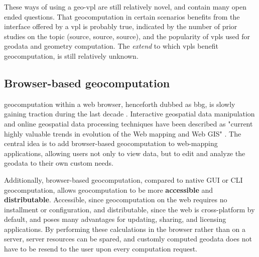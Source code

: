 These ways of using a \ac{geo-vpl} are still relatively novel, and contain many open ended questions. That geocomputation in certain scenarios benefits from the interface offered by a \ac{vpl} is probably true, indicated by the number of prior studies on the topic (source, source, source), and the popularity of \ac{vpl}s used for geodata and geometry computation. The \emph{extend} to which \ac{vpl}s benefit geocomputation, is still relatively unknown. 





\subsection*{Browser-based geocomputation}

\ac{geocomputation} within a web browser, henceforth dubbed as \ac{bbg}, is slowly gaining traction during the last decade \cite{kulawiak_analysis_2019, panidi_hybrid_2015, hamilton_client-side_2014}. 
Interactive geospatial data manipulation and online geospatial data processing techniques have been described as "current highly valuable trends in evolution of the Web mapping and Web GIS" \cite{panidi_hybrid_2015}. 
The central idea is to add browser-based geocomputation to web-mapping applications, allowing users not only to view data, but to edit and analyze the geodata to their own custom needs.

Additionally, browser-based geocomputation, compared to native GUI or CLI geocomputation, allows geocomputation to be more \textbf{accessible} and \textbf{distributable}. 
Accessible, since geocomputation on the web requires no installment or configuration, 
and distributable, since the web is cross-platform by default, and poses many advantages for updating, sharing, and licensing applications. 
By performing these calculations in the browser rather than on a server, server resources can be spared, and customly computed geodata does not have to be resend to the user upon every computation request.


